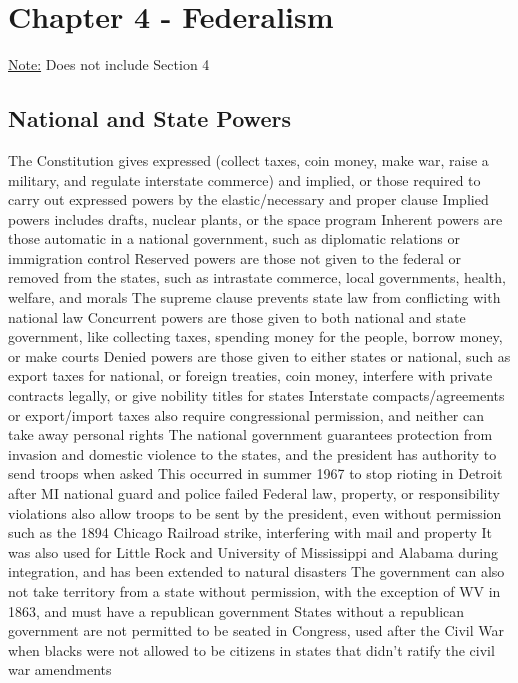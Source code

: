 \documentclass[11 pt, twoside]{article}
\newenvironment{outline*}
{
	\begin{outline}[enumerate]
	}
	{\end{outline}
}
\begin{document}
\section{Chapter 4 - Federalism}
\underline{Note:} Does not include Section 4
\subsection{National and State Powers}
\begin{outline*}
\1 The Constitution gives expressed (collect taxes, coin money, make war, raise a military, and regulate interstate commerce) and implied, or those required to carry out expressed powers by the elastic/necessary and proper clause
\2 Implied powers includes drafts, nuclear plants, or the space program
\2 Inherent powers are those automatic in a national government, such as diplomatic relations or immigration control
\1 Reserved powers are those not given to the federal or removed from the states, such as intrastate commerce, local governments, health, welfare, and morals
\2 The supreme clause prevents state law from conflicting with national law
\1 Concurrent powers are those given to both national and state government, like collecting taxes, spending money for the people, borrow money, or make courts
\1 Denied powers are those given to either states or national, such as export taxes for national, or foreign treaties, coin money, interfere with private contracts legally, or give nobility titles for states
\2 Interstate compacts/agreements or export/import taxes also require congressional permission, and neither can take away personal rights
\1 The national government guarantees protection from invasion and domestic violence to the states, and the president has authority to send troops when asked
\2 This occurred in summer 1967 to stop rioting in Detroit after MI national guard and police failed
\2 Federal law, property, or responsibility violations also allow troops to be sent by the president, even without permission such as the 1894 Chicago Railroad strike, interfering with mail and property
\2 It was also used for Little Rock and University of Mississippi and Alabama during integration, and has been extended to natural disasters
\1 The government can also not take territory from a state without permission, with the exception of WV in 1863, and must have a republican government
\2 States without a republican government are not permitted to be seated in Congress, used after the Civil War when blacks were not allowed to be citizens in states that didn’t ratify the civil war amendments

\end{outline*}
\end{document}
